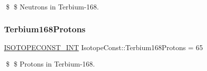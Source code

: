 \$ \$ Neutrons in Terbium-\/168. \mbox{\label{group___isotope_const-_terbium-_tb168_gaea9c2527d499f468c3a9c2ba805fdc92}} 
\subsubsection{\texorpdfstring{Terbium168\+Protons}{Terbium168Protons}}
{\footnotesize\ttfamily \mbox{\hyperlink{group___isotope_const-_macros_ga5f18360b3e99483a35c32d789e62621c}{I\+S\+O\+T\+O\+P\+E\+C\+O\+N\+S\+T\+\_\+\+I\+NT}} Isotope\+Const\+::\+Terbium168\+Protons = 65}

\$ \$ Protons in Terbium-\/168. 